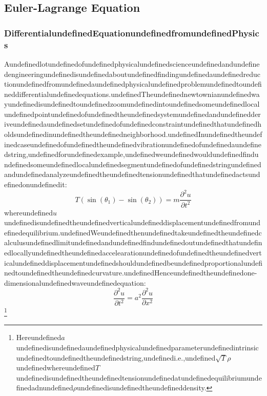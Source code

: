 \subsection{Euler-Lagrange Equation}

\subsubsection{DifferentialundefinedEquationundefinedfromundefinedPhysics}

Aundefinedlotundefinedofundefinedphysicalundefinedscienceundefinedandundefinedengineeringundefinedisundefinedaboutundefinedfindingundefinedaundefinedreductionundefinedfromundefinedaundefinedphysicalundefinedproblemundefinedtoundefineddifferentialundefinedequations.undefinedTheundefinednewtownianundefinedwayundefinedisundefinedtoundefinedzoomundefinedintoundefinedsomeundefinedlocalundefinedpointundefinedofundefinedtheundefinedsystemundefinedandundefinedderiveundefinedaundefinedsetundefinedofundefinedconstraintundefinedthatundefinedholdsundefinedinundefinedtheundefinedneighborhood.undefinedInundefinedtheundefinedcaseundefinedofundefinedtheundefinedvibrationundefinedofundefinedaundefinedstring,undefinedforundefinedexample,undefinedweundefinedwouldundefinedfindundefinedsomeundefinedlocalundefinedsegmentundefinedofundefinedstringundefinedandundefinedanalyzeundefinedtheundefinedtensionundefinedthatundefinedactsundefinedonundefinedit:
\begin{equation}
T(\sin(\theta_1)-\sin(\theta_2)) = m\frac{\partial^2 u}{\partial t^2}
\end{equation}
whereundefined$u$undefinedisundefinedtheundefinedverticalundefineddisplacementundefinedfromundefinedequilibrium.undefinedWeundefinedthenundefinedtakeundefinedtheundefinedcalculusundefinedlimitundefinedandundefinedfindundefinedoutundefinedthatundefinedlocallyundefinedtheundefinedaccelearationundefinedofundefinedtheundefinedverticalundefineddisplacementundefinedshouldundefinedbeundefinedproportionalundefinedtoundefinedtheundefinedcurvature.undefinedHenceundefinedtheundefinedone-dimensionalundefinedwaveundefinedequation:
\begin{equation}
\frac{\partial^2 u}{\partial t^2}=a^2 \frac{\partial^2 u}{\partial x^2}
\end{equation}
\footnote{Hereundefined$a$undefinedisundefinedaundefinedphysicalundefinedparameterundefinedintrinsicundefinedtoundefinedtheundefinedstring,undefinedi.e.,undefined$\sqrt{T}{\rho}$undefinedwhereundefined$T$undefinedisundefinedtheundefinedtensionundefinedatundefinedequilibriumundefinedadnundefined$\rho$undefinedisundefinedtheundefineddensity.}

